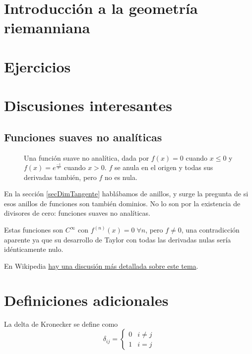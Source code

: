 \documentclass{apuntes}
\begin{document}
\chapter{Introducción a la geometría riemanniana}

\appendix

\chapter{Ejercicios}


\chapter{Discusiones interesantes}

\section{Funciones suaves no analíticas}

\begin{figure}[hbtp]
\centering
{}
\caption{Una función suave no analítica, dada por $f(x) = 0$ cuando $x ≤ 0$ y $f(x) = e^{\frac{-1}{x}}$ cuando $x > 0$. $f$ se anula en el origen y todas sus derivadas también, pero $f$ no es nula.}
\end{figure}

En la sección \ref{secDimTangente} hablábamos de anillos, y surge la pregunta de si esos anillos de funciones son también dominios. No lo son por la existencia de divisores de cero: funciones suaves no analíticas.

Estas funciones son $C^∞$ con $f^{(n)}(x) = 0\; ∀n$, pero $f ≠ 0$, una contradicción aparente ya que su desarrollo de Taylor con todas las derivadas nulas sería idénticamente nulo.

En Wikipedia \href{http://en.wikipedia.org/wiki/Non-analytic_smooth_function}{hay una discusión más detallada sobre este tema}.

\chapter{Definiciones adicionales}

\begin{defn} \label{defDeltaKronecker} La delta de Kronecker se define como \[ δ_{ij} = \begin{cases} 0 & i ≠ j \\ 1 & i = j \end{cases} \] \end{defn}
\end{document}
